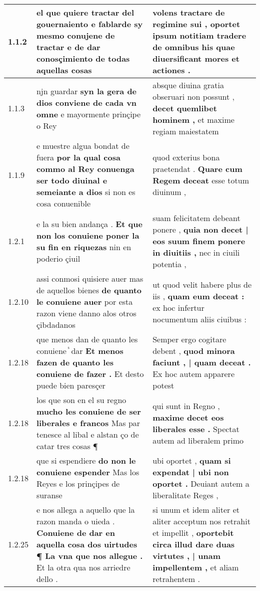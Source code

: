 \begin{tabular}{|p{1cm}|p{6.5cm}|p{6.5cm}|}

\hline
1.1.2 & el que quiere tractar del gouernaiento \textbf{ e fablarde sy mesmo conujene de tractar } e de dar conosçimiento de todas aquellas cosas & volens tractare de regimine sui , \textbf{ oportet ipsum notitiam tradere de omnibus his } quae diuersificant mores et actiones . \\\hline
1.1.3 & njn guardar \textbf{ syn la gera de dios conviene de cada vn omne } e mayormente prinçipe o Rey & absque diuina gratia obseruari non possunt , \textbf{ decet quemlibet hominem , } et maxime regiam maiestatem \\\hline
1.1.9 & e muestre algua bondat de fuera \textbf{ por la qual cosa commo al Rey conuenga ser todo diuinal e semeiante a dios } si non es cosa conuenible & quod exterius bona praetendat . \textbf{ Quare cum Regem deceat } esse totum diuinum , \\\hline
1.2.1 & e la su bien andança . \textbf{ Et que non los conuiene poner la su fin en riquezas } nin en poderio çiuil & suam felicitatem debeant ponere , \textbf{ quia non decet | eos suum finem ponere in diuitiis , } nec in ciuili potentia , \\\hline
1.2.10 & assi conmosi quisiere auer mas de aquellos bienes \textbf{ de quanto le conuiene auer } por esta razon viene danno alos otros çibdadanos & ut quod velit habere plus de iis , \textbf{ quam eum deceat : } ex hoc infertur nocumentum aliis ciuibus : \\\hline
1.2.18 & que menos dan de quanto les conuiene ᷤ dar \textbf{ Et menos fazen de quanto les conuiene de fazer . } Et desto puede bien paresçer & Semper ergo cogitare debent , \textbf{ quod minora faciunt , | quam deceat . } Ex hoc autem apparere potest \\\hline
1.2.18 & los que son en el su regno \textbf{ mucho les conuiene de ser liberales e francos } Mas par tenesce al libal e alstan ço de catar tres cosas ¶ & qui sunt in Regno , \textbf{ maxime decet eos liberales esse . } Spectat autem ad liberalem primo \\\hline
1.2.18 & que si espendiere \textbf{ do non le conuiene espender } Mas los Reyes e los prinçipes de suranse & ubi oportet , \textbf{ quam si expendat | ubi non oportet . } Deuiant autem a liberalitate Reges , \\\hline
1.2.25 & e nos allega a aquello que la razon manda o uieda . \textbf{ Conuiene de dar en aquella cosa dos uirtudes ¶ La vna que nos allegue . } Et la otra qua nos arriedre dello . & si unum et idem aliter et aliter acceptum nos retrahit et impellit , \textbf{ oportebit circa illud dare duas virtutes , | unam impellentem , } et aliam retrahentem . \\\hline

\end{tabular}
